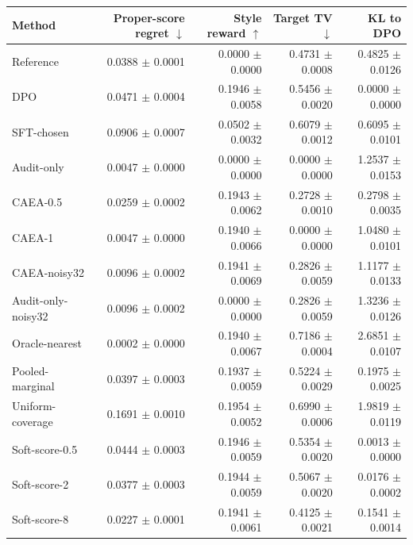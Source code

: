 \begin{tabular}{lrrrr}\toprule
Method & Proper-score regret $\downarrow$ & Style reward $\uparrow$ & Target TV $\downarrow$ & KL to DPO\\\midrule
Reference & 0.0388 $\pm$ 0.0001 & 0.0000 $\pm$ 0.0000 & 0.4731 $\pm$ 0.0008 & 0.4825 $\pm$ 0.0126 \\
DPO & 0.0471 $\pm$ 0.0004 & 0.1946 $\pm$ 0.0058 & 0.5456 $\pm$ 0.0020 & 0.0000 $\pm$ 0.0000 \\
SFT-chosen & 0.0906 $\pm$ 0.0007 & 0.0502 $\pm$ 0.0032 & 0.6079 $\pm$ 0.0012 & 0.6095 $\pm$ 0.0101 \\
Audit-only & 0.0047 $\pm$ 0.0000 & 0.0000 $\pm$ 0.0000 & 0.0000 $\pm$ 0.0000 & 1.2537 $\pm$ 0.0153 \\
CAEA-0.5 & 0.0259 $\pm$ 0.0002 & 0.1943 $\pm$ 0.0062 & 0.2728 $\pm$ 0.0010 & 0.2798 $\pm$ 0.0035 \\
CAEA-1 & 0.0047 $\pm$ 0.0000 & 0.1940 $\pm$ 0.0066 & 0.0000 $\pm$ 0.0000 & 1.0480 $\pm$ 0.0101 \\
CAEA-noisy32 & 0.0096 $\pm$ 0.0002 & 0.1941 $\pm$ 0.0069 & 0.2826 $\pm$ 0.0059 & 1.1177 $\pm$ 0.0133 \\
Audit-only-noisy32 & 0.0096 $\pm$ 0.0002 & 0.0000 $\pm$ 0.0000 & 0.2826 $\pm$ 0.0059 & 1.3236 $\pm$ 0.0126 \\
Oracle-nearest & 0.0002 $\pm$ 0.0000 & 0.1940 $\pm$ 0.0067 & 0.7186 $\pm$ 0.0004 & 2.6851 $\pm$ 0.0107 \\
Pooled-marginal & 0.0397 $\pm$ 0.0003 & 0.1937 $\pm$ 0.0059 & 0.5224 $\pm$ 0.0029 & 0.1975 $\pm$ 0.0025 \\
Uniform-coverage & 0.1691 $\pm$ 0.0010 & 0.1954 $\pm$ 0.0052 & 0.6990 $\pm$ 0.0006 & 1.9819 $\pm$ 0.0119 \\
Soft-score-0.5 & 0.0444 $\pm$ 0.0003 & 0.1946 $\pm$ 0.0059 & 0.5354 $\pm$ 0.0020 & 0.0013 $\pm$ 0.0000 \\
Soft-score-2 & 0.0377 $\pm$ 0.0003 & 0.1944 $\pm$ 0.0059 & 0.5067 $\pm$ 0.0020 & 0.0176 $\pm$ 0.0002 \\
Soft-score-8 & 0.0227 $\pm$ 0.0001 & 0.1941 $\pm$ 0.0061 & 0.4125 $\pm$ 0.0021 & 0.1541 $\pm$ 0.0014 \\
\bottomrule\end{tabular}
